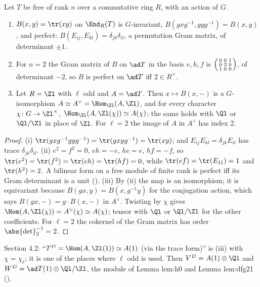 \begin{proposition}\label{prop:reps:trace-form}
Let $T$ be free of rank $n$ over a commutative ring $R$, with an action of $G$.
\begin{enumerate}[label=(\roman*)]
\item $B(x,y)=\tr(xy)$ on $\End_R(T)$ is $G$-invariant, $B(gxg^{-1},gyg^{-1})=B(x,y)$, and perfect: $B(E_{ij},E_{kl})=\delta_{jk}\delta_{il}$, a permutation Gram
matrix, of determinant $\pm1$.
\item For $n=2$ the Gram matrix of $B$ on $\ad T$ in the basis $e,h,f$ is $\begin{psmallmatrix}0&0&1\\0&2&0\\1&0&0\end{psmallmatrix}$, of determinant $-2$, so $B$ is
perfect on $\ad T$ iff $2\in R^\times$.
\item Let $R=\Zl$ with $\ell$ odd and $A=\ad T$. Then $x\mapsto B(x,{-})$ is a $G$-isomorphism $A\simeq A^\vee=\Hom_{\Zl}(A,\Zl)$, and for every character
$\chi\colon G\to\Zl^\times$, $\Hom_{\Zl}(A,\Zl(\chi))\simeq A(\chi)$; the same holds with $\Ql$ or $\Ql/\Zl$ in place of $\Zl$. For $\ell=2$ the image of
$A$ in $A^\vee$ has index $2$.
\end{enumerate}
\end{proposition}

\begin{proof}
(i) $\tr(gxg^{-1}gyg^{-1})=\tr(gxyg^{-1})=\tr(xy)$; and $E_{ij}E_{kl}=\delta_{jk}E_{il}$ has trace $\delta_{jk}\delta_{il}$. (ii) $e^2=f^2=0$, $eh=-e$, $he=e$,
$hf=-f$, so $\tr(e^2)=\tr(f^2)=\tr(eh)=\tr(hf)=0$, while $\tr(ef)=\tr(E_{11})=1$ and $\tr(h^2)=2$. A bilinear form on a free module of finite rank is
perfect iff its Gram determinant is a unit (). (iii) By (ii) the map is an isomorphism; it is equivariant because
$B(gx,y)=B(x,g^{-1}y)$ for the conjugation action, which says $B(gx,{-})=g\cdot B(x,{-})$ in $A^\vee$. Twisting by $\chi$ gives
$\Hom(A,\Zl(\chi))=A^\vee(\chi)\simeq A(\chi)$; tensor with $\Ql$ or $\Ql/\Zl$ for the other coefficients. For $\ell=2$ the cokernel of the Gram matrix
has order $\abs{\det}_2^{-1}=2$.
\end{proof}

\begin{paperlink}
Section 4.2: ``$T^D=\Hom(A,\Zl(1))\simeq A(1)$ (via the trace form)'' is (iii) with $\chi=\chi_\ell$; it is one of the places where $\ell$ odd is used.
Then $V^D=A(1)\otimes\Ql$ and $W^D=\ad T(1)\otimes\Ql/\Zl$, the module of Lemma lem:h0 and Lemma lem:dfg21 ().
\end{paperlink}

